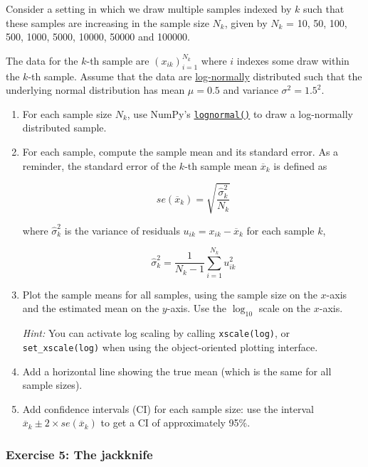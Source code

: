 \documentclass{scrartcl}
\begin{document}
Consider a setting in which we draw multiple samples indexed by \(k\)
such that these samples are increasing in the sample size \(N_k\), given
by \(N_k\) = 10, 50, 100, 500, 1000, 5000, 10000, 50000 and 100000.

The data for the \(k\)-th sample are \((x_{ik})_{i=1}^{N_k}\) where
\(i\) indexes some draw within the \(k\)-th sample. Assume that the data
are
\href{https://en.wikipedia.org/wiki/Log-normal_distribution}{log-normally}
distributed such that the underlying normal distribution has mean
\(\mu=0.5\) and variance \(\sigma^2 = 1.5^2\).

\begin{enumerate}
\def\labelenumi{\arabic{enumi}.}
\item
  For each sample size \(N_k\), use NumPy's
  \href{https://numpy.org/doc/stable/reference/random/generated/numpy.random.Generator.lognormal.html}{\texttt{lognormal()}}
  to draw a log-normally distributed sample.
\item
  For each sample, compute the sample mean and its standard error. As a
  reminder, the standard error of the \(k\)-th sample mean
  \(\overline{x}_k\) is defined as

  \[se(\overline{x}_k) = \sqrt{\frac{\widehat{\sigma}_{k}^2}{N_k}}\]

  where \(\widehat{\sigma}_{k}^2\) is the variance of residuals
  \(u_{ik} = x_{ik} - \overline{x}_k\) for each sample \(k\),

  \[\widehat{\sigma}_{k}^2 = \frac{1}{N_k-1}\sum_{i=1}^{N_k} u_{ik}^2\]
\item
  Plot the sample means for all samples, using the sample size on the
  \(x\)-axis and the estimated mean on the \(y\)-axis. Use the
  \(\log_{10}\) scale on the \(x\)-axis.

  \emph{Hint:} You can activate log scaling by calling
  \texttt{xscale(\textquotesingle{}log\textquotesingle{})}, or
  \texttt{set\_xscale(\textquotesingle{}log\textquotesingle{})} when
  using the object-oriented plotting interface.
\item
  Add a horizontal line showing the true mean (which is the same for all
  sample sizes).
\item
  Add confidence intervals (CI) for each sample size: use the interval
  \(\overline{x}_k \pm 2\times se(\overline{x}_k)\) to get a CI of
  approximately 95\%.
\end{enumerate}

    \hypertarget{exercise-5-the-jackknife}{%
\subsubsection{Exercise 5: The
jackknife}\label{exercise-5-the-jackknife}}
\end{document}
